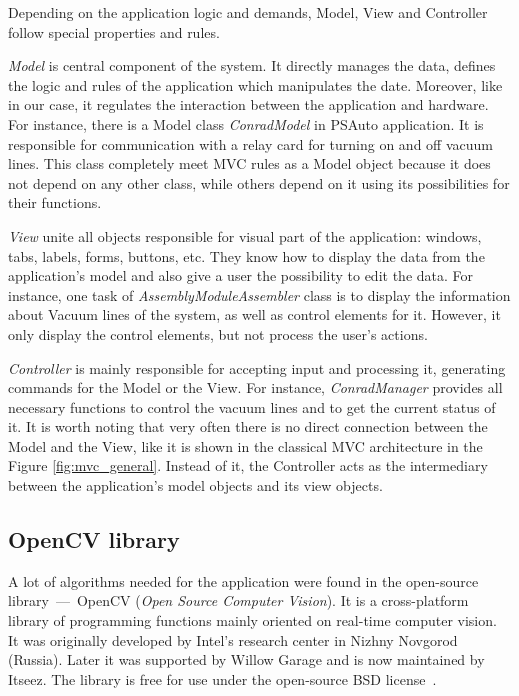Depending on the application logic and demands, Model, View and Controller follow special properties and rules.

\emph{Model} is central component of the system. It directly manages the data, defines the logic and rules of the application which manipulates the date. Moreover, like in our case, it regulates the interaction between the application and hardware. For instance, there is a Model class \emph{ConradModel} in PSAuto application. It is responsible for communication with a relay card for turning on and off vacuum lines. This class completely meet MVC rules as a Model object because it does not depend on any other class, while others depend on it using its possibilities for their functions.

\emph{View} unite all objects responsible for visual part of the application: windows, tabs, labels, forms, buttons, etc. They know how to display the data from the application's model and also give a user the possibility to edit the data. For instance, one task of \emph{AssemblyModuleAssembler} class is to display the information about Vacuum lines of the system, as well as control elements for it. However, it only display the control elements, but not process the user's actions.

\emph{Controller} is mainly responsible for accepting input and processing it, generating commands for the Model or the View. For instance, \emph{ConradManager} provides all necessary functions to control the vacuum lines and to get the current status of it. It is worth noting that very often there is no direct connection between the Model and the View, like it is shown in the classical MVC architecture in the Figure \ref{fig:mvc_general}. Instead of it, the Controller acts as the intermediary between the application's model objects and its view objects.

\subsection{OpenCV library}

A lot of algorithms needed for the application were found in the open-source library~---~OpenCV (\textit{Open Source Computer Vision}). It is a cross-platform library of programming functions mainly oriented on real-time computer vision. It was originally developed by Intel's research center in Nizhny Novgorod (Russia). Later it was supported by Willow Garage and is now maintained by Itseez. The library is free for use under the open-source BSD license~\cite{OpenCV_general}.

